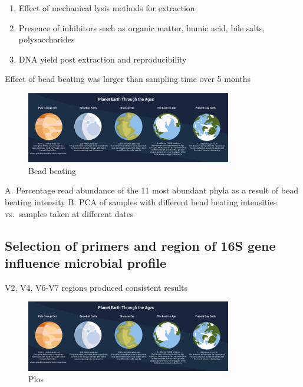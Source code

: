 \documentclass[
]{book}
\providecommand{\tightlist}{%
  \setlength{\itemsep}{0pt}\setlength{\parskip}{0pt}}
\begin{document}
\begin{enumerate}
\def\labelenumi{\arabic{enumi}.}
\tightlist
\item
  Effect of mechanical lysis methods for extraction
\item
  Presence of inhibitors such as organic matter, humic acid, bile salts, polysaccharides
\item
  DNA yield post extraction and reproducibility
\end{enumerate}

Effect of bead beating was larger than sampling time over 5 months

\begin{figure}
\centering
\includegraphics[width=0.8\textwidth,height=\textheight]{./Figures/Planets.png}
\caption{Bead beating}
\end{figure}

A. Percentage read abundance of the 11 most abundant phyla as a result of bead beating intensity
B. PCA of samples with different bead beating intensities vs.~samples taken at different dates

\hypertarget{selection-of-primers-and-region-of-16s-gene-influence-microbial-profile}{%
\subsection{Selection of primers and region of 16S gene influence microbial profile}\label{selection-of-primers-and-region-of-16s-gene-influence-microbial-profile}}

V2, V4, V6-V7 regions produced consistent results

\begin{figure}
\centering
\includegraphics[width=0.8\textwidth,height=\textheight]{./Figures/Planets.png}
\caption{Plos}
\end{figure}
\end{document}

